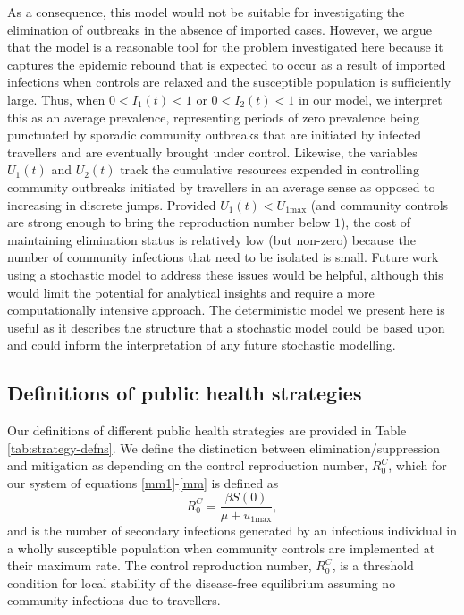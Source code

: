 \documentclass[pdflatex]{sn-jnl}
\theoremstyle{thmstyleone}%
\theoremstyle{thmstyletwo}%
\theoremstyle{thmstylethree}%
\begin{document}
As a consequence, this model would not be suitable for investigating the elimination of outbreaks in the absence of imported cases. However, we argue that the model is a reasonable tool for the problem investigated here because it captures the epidemic rebound that is expected to occur as a result of imported infections when controls are relaxed and the susceptible population is sufficiently large. Thus, when $0<I_1(t)<1$ or $0<I_2(t)<1$ in our model, we interpret this as an average prevalence, representing periods of zero prevalence being punctuated by sporadic community outbreaks that are initiated by infected travellers and are eventually brought under control. Likewise, the variables $U_1(t)$ and $U_2(t)$ track the cumulative resources expended in controlling community outbreaks initiated by travellers in an average sense as opposed to increasing in discrete jumps. Provided $U_1(t)<U_{1\mathrm{max}}$ (and community controls are strong enough to bring the reproduction number below $1$), the cost of maintaining elimination status is relatively low (but non-zero) because the number of community infections that need to be isolated is small.
Future work using a stochastic model to address these issues would be helpful, although this would limit the potential for analytical insights and require a more computationally intensive approach. The deterministic model we present here is useful as it describes the structure that a stochastic model could be based upon and could inform the interpretation of any future stochastic modelling.

\subsection{Definitions of public health strategies} \label{sec:PH_strategies}

Our definitions of different public health strategies are provided in Table \ref{tab:strategy-defns}. We define the distinction between elimination/suppression and mitigation as depending on the control reproduction number, $R_0^C$, which for our system of equations \eqref{mm1}-\eqref{mm} is defined as
%
\begin{equation}
R_0^C = \frac{\beta S(0)}{\mu + u_{1\text{max}}},
\end{equation}
%
and is the number of secondary infections generated by an infectious individual in a wholly susceptible population when community controls are implemented at their maximum rate. The control reproduction number, $R_0^C$, is a threshold condition for local stability of the disease-free equilibrium assuming no community infections due to travellers.
\end{document}
